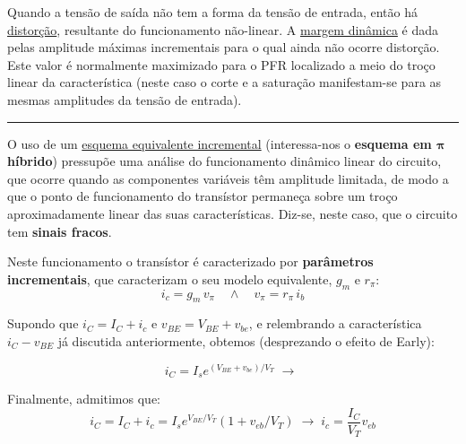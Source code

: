 \noindent Quando a tensão de saída não tem a forma da tensão de entrada, então há \underline{distorção}, resultante do funcionamento não-linear. A \underline{margem dinâmica} é dada pelas amplitude máximas incrementais para o qual ainda não ocorre distorção. Este valor é normalmente maximizado para o PFR localizado a meio do troço linear da característica (neste caso o corte e a saturação manifestam-se para as mesmas amplitudes da tensão de entrada).
\vspace{1em}\hrule\vspace{1em}
\noindent O uso de um \underline{esquema equivalente incremental} (interessa-nos o \textbf{esquema em $\pmb{\pi}$ híbrido}) pressupõe uma análise do funcionamento dinâmico linear do circuito, que ocorre quando as componentes variáveis têm amplitude limitada, de modo a que o ponto de funcionamento do transístor permaneça sobre um troço aproximadamente linear das suas características. Diz-se, neste caso, que o circuito tem \textbf{sinais fracos}.

\vspace{1 em}
\noindent Neste funcionamento o transístor é caracterizado por \textbf{parâmetros incrementais}, que caracterizam o seu modelo equivalente, $g_m$ e $r_\pi$:
$$
    \boxed{i_c = g_m\, v_{\pi}} \quad\land\quad \boxed{v_{\pi} = r_\pi\, i_b}
$$

\newpage
\begin{mdframed}
    \noindent Supondo que $i_C = I_C + i_c$ e $v_{BE} = V_{BE} + v_{be}$, e relembrando a característica $i_C-v_{BE}$ já discutida anteriormente, obtemos (desprezando o efeito de Early):

    \vspace{-0.25em}
    \begin{center}
        \begin{minipage}{0.3\linewidth}
            $$
                \boxed{i_C = I_se^{(V_{BE} + v_{be})/ V_T}}  \;\rightarrow\;
            $$
        \end{minipage}%
    \end{center}

    \vspace{-0.5em}
    \noindent Finalmente, admitimos que:
    $$
        i_C = I_C + i_c = I_se^{V_{BE}/ V_T}(1 + v_{eb}/V_T)\;
        \rightarrow\; \boxed{i_c = \dfrac{I_C}{V_T} v_{eb}}
    $$
\end{mdframed}

